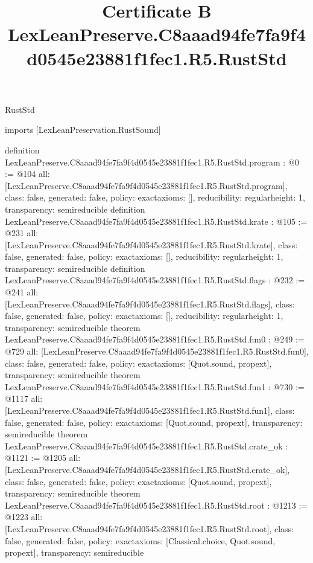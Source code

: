 \begin{lexlean}{RustStd}
\title{Certificate B LexLeanPreserve.C8aaad94fe7fa9f4d0545e23881f1fec1.R5.RustStd}
\begin{coremodule}
imports [LexLeanPreservation.RustSound]

definition LexLeanPreserve.C8aaad94fe7fa9f4d0545e23881f1fec1.R5.RustStd.program : @0 := @104 {
  all: [LexLeanPreserve.C8aaad94fe7fa9f4d0545e23881f1fec1.R5.RustStd.program],
  class: false,
  generated: false,
  policy: exact{axioms: []},
  reducibility: regular{height: 1},
  transparency: semireducible
}
definition LexLeanPreserve.C8aaad94fe7fa9f4d0545e23881f1fec1.R5.RustStd.krate : @105 := @231 {
  all: [LexLeanPreserve.C8aaad94fe7fa9f4d0545e23881f1fec1.R5.RustStd.krate],
  class: false,
  generated: false,
  policy: exact{axioms: []},
  reducibility: regular{height: 1},
  transparency: semireducible
}
definition LexLeanPreserve.C8aaad94fe7fa9f4d0545e23881f1fec1.R5.RustStd.flags : @232 := @241 {
  all: [LexLeanPreserve.C8aaad94fe7fa9f4d0545e23881f1fec1.R5.RustStd.flags],
  class: false,
  generated: false,
  policy: exact{axioms: []},
  reducibility: regular{height: 1},
  transparency: semireducible
}
theorem LexLeanPreserve.C8aaad94fe7fa9f4d0545e23881f1fec1.R5.RustStd.fun0 : @249 := @729 {
  all: [LexLeanPreserve.C8aaad94fe7fa9f4d0545e23881f1fec1.R5.RustStd.fun0],
  class: false,
  generated: false,
  policy: exact{axioms: [Quot.sound, propext]},
  transparency: semireducible
}
theorem LexLeanPreserve.C8aaad94fe7fa9f4d0545e23881f1fec1.R5.RustStd.fun1 : @730 := @1117 {
  all: [LexLeanPreserve.C8aaad94fe7fa9f4d0545e23881f1fec1.R5.RustStd.fun1],
  class: false,
  generated: false,
  policy: exact{axioms: [Quot.sound, propext]},
  transparency: semireducible
}
theorem LexLeanPreserve.C8aaad94fe7fa9f4d0545e23881f1fec1.R5.RustStd.crate_ok : @1121 := @1205 {
  all: [LexLeanPreserve.C8aaad94fe7fa9f4d0545e23881f1fec1.R5.RustStd.crate_ok],
  class: false,
  generated: false,
  policy: exact{axioms: [Quot.sound, propext]},
  transparency: semireducible
}
theorem LexLeanPreserve.C8aaad94fe7fa9f4d0545e23881f1fec1.R5.RustStd.root : @1213 := @1223 {
  all: [LexLeanPreserve.C8aaad94fe7fa9f4d0545e23881f1fec1.R5.RustStd.root],
  class: false,
  generated: false,
  policy: exact{axioms: [Classical.choice, Quot.sound, propext]},
  transparency: semireducible
}


\end{coremodule}
\end{lexlean}
